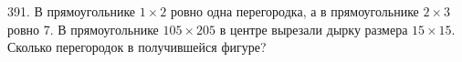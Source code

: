 391. В прямоугольнике $1\times2$ ровно одна перегородка, а в прямоугольнике $2\times3$ ровно 7. В прямоугольнике $105\times205$ в центре вырезали
дырку размера $15\times15.$ Сколько перегородок в получившейся фигуре?\\
